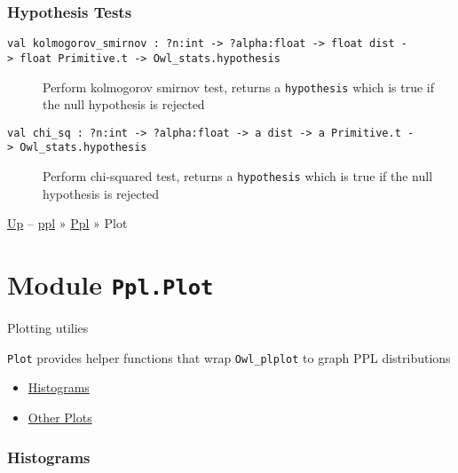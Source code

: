 \hypertarget{hypux5ftests}{\subsubsection{\texorpdfstring{\protect\hyperlink{hypux5ftests}{}Hypothesis
Tests}{Hypothesis Tests}}\label{hypux5ftests}}

\begin{description}
\item[{\protect\hyperlink{val-kolmogorovux5fsmirnov}{}\texttt{val\ kolmogorov\_smirnov\ :\ ?⁠n:int\ -\textgreater{}\ ?⁠alpha:float\ -\textgreater{}\ float\ dist\ -\textgreater{}\ float\ Primitive.t\ -\textgreater{}\ Owl\_stats.hypothesis}}]
Perform kolmogorov smirnov test, returns a \texttt{hypothesis} which is
true if the null hypothesis is rejected
\end{description}

\begin{description}
\item[{\protect\hyperlink{val-chiux5fsq}{}\texttt{val\ chi\_sq\ :\ ?⁠n:int\ -\textgreater{}\ ?⁠alpha:float\ -\textgreater{}\ \textquotesingle{}a\ dist\ -\textgreater{}\ \textquotesingle{}a\ Primitive.t\ -\textgreater{}\ Owl\_stats.hypothesis}}]
Perform chi-squared test, returns a \texttt{hypothesis} which is true if
the null hypothesis is rejected
\end{description}

\href{../index.html}{Up} -- \href{../../index.html}{ppl} »
\href{../index.html}{Ppl} » Plot

\section{\texorpdfstring{Module
\texttt{Ppl.Plot}}{Module Ppl.Plot}}\label{module-ppl.plot}

Plotting utilies

\texttt{Plot} provides helper functions that wrap \texttt{Owl\_plplot}
to graph PPL distributions

\begin{itemize}
\tightlist
\item
  \protect\hyperlink{histograms}{Histograms}
\item
  \protect\hyperlink{otherux5fplots}{Other Plots}
\end{itemize}

\hypertarget{histograms}{\subsubsection{\texorpdfstring{\protect\hyperlink{histograms}{}Histograms}{Histograms}}\label{histograms}}

